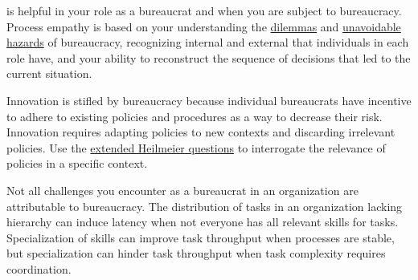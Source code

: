 

\iftoggle{glossarysubstitutionworks}{\Gls{process empathy}}{Process empathy} 
is helpful in your role as a bureaucrat and when you are subject to bureaucracy. 
Process empathy is based on your understanding the \hyperref[sec:dilemma-trilemma]{dilemmas} and \hyperref[sec:unavoidable-hazards]{unavoidable hazards} of bureaucracy, recognizing internal 
\iftoggle{glossarysubstitutionworks}{\glspl{motive}}{motives} and external 
\iftoggle{glossarysubstitutionworks}{\glspl{incentive}}{incentives}
 that individuals in each role have, and your ability to reconstruct the sequence of decisions that led to the current situation. 


Innovation is stifled by bureaucracy%
\iftoggle{haspagenumbers}{ (see page~\pageref{sec:innovation})}{} because individual bureaucrats have incentive to adhere to existing policies and procedures as a way to decrease their risk. Innovation requires adapting policies to new contexts and discarding irrelevant policies. 
Use the \hyperref[sec:extending-Heilmeier]{extended Heilmeier questions}%
\iftoggle{haspagenumbers}{ (see page~\pageref{sec:extending-Heilmeier})}{} to interrogate the relevance of policies in a specific context.


Not all challenges you encounter as a bureaucrat in an organization are attributable to bureaucracy. The distribution of tasks in an organization lacking hierarchy can induce latency when not everyone has all relevant skills for tasks. Specialization of skills can improve task throughput when processes are stable, but specialization can hinder task throughput when task complexity requires coordination.


